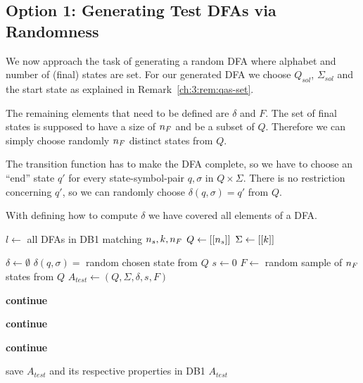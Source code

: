 \subsection{Option 1: Generating Test DFAs via Randomness}

We now approach the task of generating a random DFA where alphabet and number of (final) states are set. For our generated DFA we choose $Q_{sol}$, $\Sigma_{sol}$ and the start state as explained in Remark~\ref{ch:3:rem:qas-set}.

The remaining elements that need to be defined are $\delta$ and $F$. The set of final states is supposed to have a size of ${n_F}$ and be a subset of $Q$. Therefore we can simply choose randomly ${n_F}$ distinct states from $Q$.

\noindent The transition function has to make the DFA complete, so we have to choose an ``end'' state $q'$ for every state-symbol-pair $q,\sigma$ in $Q \times \Sigma$. There is no restriction concerning $q'$, so we can randomly choose $\delta(q, \sigma) = q'$ from $Q$.

With defining how to compute $\delta$ we have covered all elements of a DFA.

\vspace{0.2cm}
\begin{algorithmic}[1]
	
		\vspace{0.2cm}
	
		\State $l \gets$ all DFAs in DB1 matching ${n_s}, k, {n_F}$
		\State $Q \gets[[{n_s}]]$
		\State $\Sigma \gets [[k]]$
		
		\vspace{0.2cm}
		
		
		\vspace{0.2cm}
		
			\State $\delta \gets \emptyset$
				\State $\delta(q,\sigma) = $ random chosen state from $Q$
			\EndFor
			\State $s \gets 0$
			\State $F \gets$ random sample of ${n_F}$ states from $Q$
			\State $A_{test} \gets (Q, \Sigma, \delta, s, F)$
			
			\vspace{0.2cm}
			
			\State \textbf{continue}
			\EndIf
			
			\State \textbf{continue}
			\EndIf
			
			\State \textbf{continue}
			\EndIf
			
			\vspace{0.2cm}
			
			\State save $A_{test}$ and its respective properties in DB1
			\State\Return $A_{test}$
		\EndWhile
	\EndFunction
\end{algorithmic}
\vspace{0.2cm}

